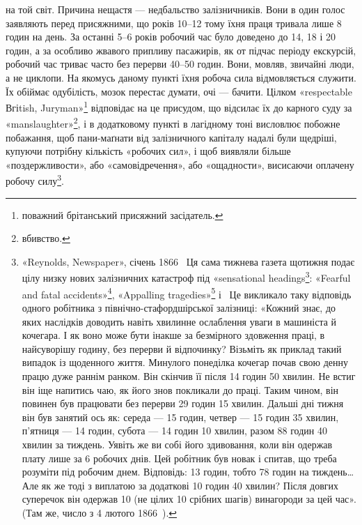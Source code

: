 \parcont{}  %
на той світ. Причина нещастя — недбальство залізничників. Вони
в один голос заявляють перед присяжними, що років 10--12 тому
їхня праця тривала лише 8 годин на день. За останні 5--6 років
робочий час було доведено до 14, 18 і 20 годин, а за особливо
жвавого припливу пасажирів, як от підчас періоду екскурсій,
робочий час триває часто без перерви 40--50 годин. Вони, мовляв,
звичайні люди, а не циклопи. На якомусь даному пункті
їхня робоча сила відмовляється служити. Їх обіймає одубілість,
мозок перестає думати, очі — бачити. Цілком «respectable Вгіtish,
Juryman»\footnote*{
поважний брітанський присяжний засідатель. 
} відповідає на це присудом, що відсилає їх до
карного суду за «manslaughter»\footnote*{
вбивство. 
}, і в додатковому пункті в лагідному
тоні висловлює побожне побажання, щоб пани-маґнати
від залізничного капіталу надалі були щедріші, купуючи потрібну
кількість «робочих сил», і щоб виявляли більше «поздержливости»,
або «самовідречення», або «ощадности», висисаючи
оплачену робочу силу\footnote{
«Reynolds, Newspaper», січень 1866~ Ця сама тижнева газета щотижня
подає цілу низку нових залізничних катастроф під «sensational headings\footnote*{
сенсаційними заголовками. 
}:
«Fearful and fatal accidents»\footnote*{
Жахливий і фатальний випадок. 
}, «Appalling tragedies»\footnote*{
Жахлива трагедія. 
} і~
Це викликало таку відповідь одного робітника з північно-стафордшірської
залізниці: «Кожний знає, до яких наслідків доводить навіть хвилинне
ослаблення уваги в машиніста й кочегара. І як воно може бути інакше
за безмірного здовження праці, в найсуворішу годину, без перерви й відпочинку?
Візьміть як приклад такий випадок із щоденного життя. Минулого
понеділка кочегар почав свою денну працю дуже раннім ранком.
Він скінчив її після 14 годин 50 хвилин. Не встиг він іще напитись чаю,
як його знов покликали до праці. Таким чином, він повинен був працювати
без перерви 29 годин 15 хвилин. Дальші дні тижня він був занятий ось
як: середа — 15 годин, четвер — 15 годин 35 хвилин, п’ятниця — 14 годин,
субота — 14 годин 10 хвилин, разом 88 годин 40 хвилин за тиждень.
Уявіть же ви собі його здивовання, коли він одержав плату лише за 6 робочих
днів. Цей робітник був новак і спитав, що треба розуміти під робочим
днем. Відповідь: 13 годин, тобто 78 годин на тиждень\dots{} Але як же тоді
з виплатою за додаткові 10 годин 40 хвилин? Після довгих суперечок він
одержав 10 (не цілих 10 срібних шагів) винагороди за цей час».
(Там же, число з 4 лютого 1866~).
}.

